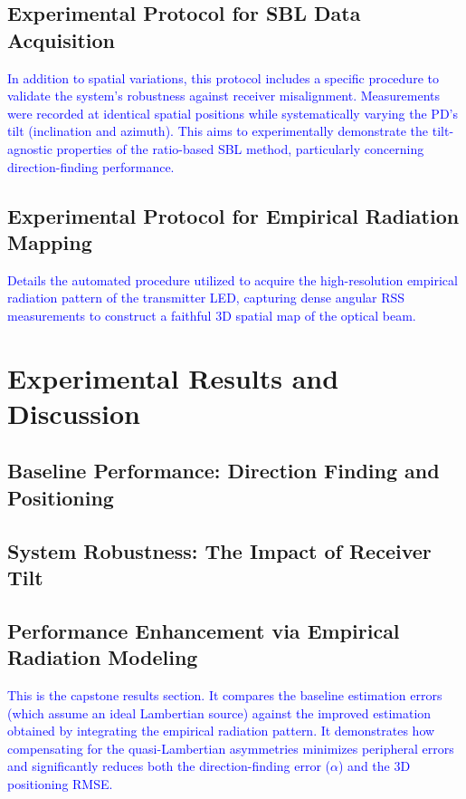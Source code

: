 \documentclass[journal]{IEEEtran}
\begin{document}
    \subsection{Experimental Protocol for SBL Data Acquisition}
    \textcolor{blue}{In addition to spatial variations, this protocol includes a specific procedure to validate the system's robustness against receiver misalignment. Measurements were recorded at identical spatial positions while systematically varying the PD's tilt (inclination and azimuth). This aims to experimentally demonstrate the tilt-agnostic properties of the ratio-based SBL method, particularly concerning direction-finding performance.}

    \subsection{Experimental Protocol for Empirical Radiation Mapping}
    \textcolor{blue}{Details the automated procedure utilized to acquire the high-resolution empirical radiation pattern of the transmitter LED, capturing dense angular RSS measurements to construct a faithful 3D spatial map of the optical beam.}

\section{Experimental Results and Discussion}
    \subsection{Baseline Performance: Direction Finding and Positioning}
    
    \subsection{System Robustness: The Impact of Receiver Tilt}
    
    \subsection{Performance Enhancement via Empirical Radiation Modeling}
    \textcolor{blue}{This is the capstone results section. It compares the baseline estimation errors (which assume an ideal Lambertian source) against the improved estimation obtained by integrating the empirical radiation pattern. It demonstrates how compensating for the quasi-Lambertian asymmetries minimizes peripheral errors and significantly reduces both the direction-finding error ($\alpha$) and the 3D positioning RMSE.}
\end{document}
